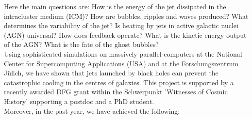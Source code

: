 \noindent Here the main questions are: How is the energy of the jet
dissipated in the intracluster medium (ICM)? How are bubbles, ripples
and waves produced?  What determines the variability of the jet? Is
heating by jets in active galactic nuclei (AGN) universal? How does
feedback operate? What is the kinetic energy output of the AGN? What
is the fate of the ghost bubbles?\\

\noindent Using sophisticated simulations on massively parallel
computers at the National Center for Supercomputing Applications (USA)
and at the Forschungszentrum J\"ulich, we have shown that jets
launched by black holes can prevent the catastrophic cooling in the
centres of galaxies. This project is supported by a recently awarded DFG grant within the
Schwerpunkt 'Witnesses of Cosmic History' supporting a postdoc and a
PhD student.\\

\noindent Moreover, in the past year, we have achieved the following:

